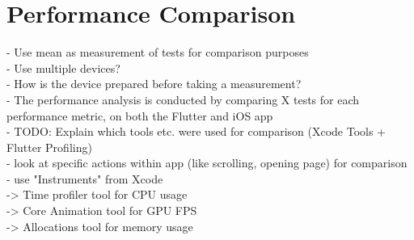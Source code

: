 \chapter{Performance Comparison}

- Use mean as measurement of tests for comparison purposes\\
- Use multiple devices?\\
- How is the device prepared before taking a measurement?\\
- The performance analysis is conducted by comparing X tests for each performance metric, on both the Flutter and iOS app\\
- TODO: Explain which tools etc. were used for comparison (Xcode Tools + Flutter Profiling)\\
- look at specific actions within app (like scrolling, opening page) for comparison\\
- use "Instruments" from Xcode\\
-> Time profiler tool for CPU usage\\
-> Core Animation tool for GPU FPS\\
-> Allocations tool for memory usage\\